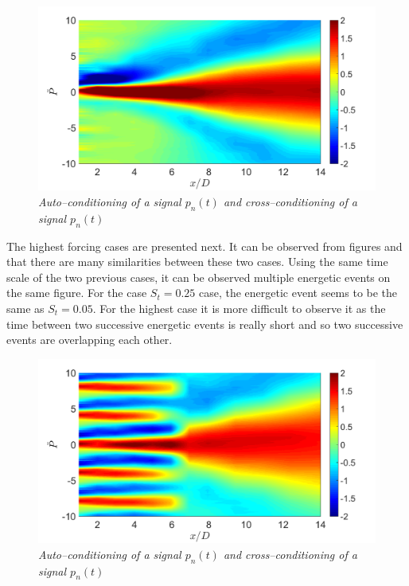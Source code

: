 \begin{figure}
	\centering
	\includegraphics[width=1\textwidth]{Figures/conditioning/autoCondSt0p05.png}
	\caption{\textit{Auto--conditioning of a signal $p_n(t)$ and cross--conditioning of a signal $p_n(t)$}}
	\label{fig:autoCondSt0p05}
\end{figure}

The highest forcing cases are presented next. It can be observed from figures  and  that there are many similarities between these two cases. Using the same time scale of the two previous cases, it can be observed multiple energetic events on the same figure. For the case $S_t = 0.25$ case, the energetic event seems to be the same as $S_t = 0.05$. For the highest case it is more difficult to observe it as the time between two successive energetic events is really short and so two successive events are overlapping each other. 

\begin{figure}
	\centering
	\includegraphics[width=1\textwidth]{Figures/conditioning/autoCondSt0p25.png}
	\caption{\textit{Auto--conditioning of a signal $p_n(t)$ and cross--conditioning of a signal $p_n(t)$}}
	\label{fig:autoCondSt0p25}
\end{figure}


